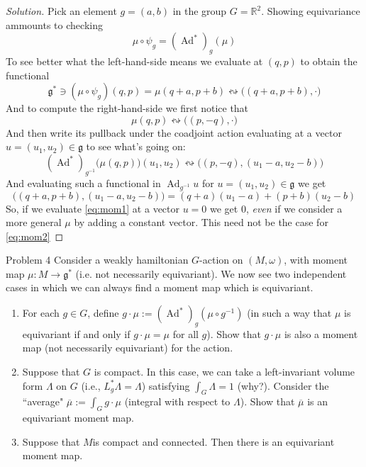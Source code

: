 \begin{proof}[Solution]
Pick an element $g=(a,b)$ in the group $G=\mathbb{R}^2$. Showing equivariance ammounts to checking
\[\mu \circ \psi_g=(\operatorname{Ad}^*)_g(\mu)\]
To see better what the left-hand-side means we evaluate at $(q,p)$ to obtain the functional
\begin{equation}\label{eq:mom1}
\mathfrak{g}^*\ni(\mu \circ \psi_g)(q,p)=\mu(q+a,p+b)\leftrightsquigarrow \Big((q+a,p+b),\cdot\Big)
\end{equation}
And to compute the right-hand-side we first notice that
\[\mu(q,p)\leftrightsquigarrow\Big((p,-q),\cdot\Big)\]
And then write its pullback under the coadjoint action evaluating at a vector $u=(u_1,u_2)\in\mathfrak{g}$ to see what's going on:
\[(\operatorname{Ad}^*)_{g^{-1}}\Big(\mu(q,p)\Big)(u_1,u_2)\leftrightsquigarrow\Big((p,-q),(u_1-a,u_2-b)\Big)\]
And evaluating such a functional in $\operatorname{Ad}_{g^{-1}}u$ for $u=(u_1,u_2)\in\mathfrak{g}$ we get
\begin{equation}\label{eq:mom2}
	\Big((q+a,p+b),(u_1-a,u_2-b)\Big)=(q+a)(u_1-a)+(p+b)(u_2-b)
	\end{equation}
So, if we evaluate  \cref{eq:mom1} at a vector $u=0$ we get 0, \textit{even} if we consider a more general $\mu$ by adding a constant vector. This need not be the case for \cref{eq:mom2}
\end{proof}

\begin{thing1}{Problem 4}\leavevmode
Consider a weakly hamiltonian $G$-action on $(M,\omega)$, with moment map $\mu:M\to\mathfrak{g}^*$ (i.e. not necessarily equivariant). We now see two independent cases in which we can always find a moment map which is equivariant.
\begin{enumerate}[label=(\alph*)]
\item For each $g\in G$, define $g\cdot\mu:=(\operatorname{Ad}^*)_g(\mu\circ g^{-1})$ (in such a way that $\mu$ is equivariant if and only if $g\cdot \mu=\mu$ for all $g$). Show that $g\cdot\mu$ is also a moment map (not necessarily equivariant) for the action.

\item Suppose that $G$ is compact. In this case, we can take a left-invariant volume form $\Lambda$ on $G$ (i.e., $L^*_g\Lambda=\Lambda$) satisfying $\int_{G}\Lambda=1$ (why?). Consider the ``average" $\overline{\mu}:=\int_{G}g\cdot\mu$ (integral with respect to $\Lambda$). Show that $\overline{\mu}$ is an equivariant moment map.
\item Suppose that $M$is compact and connected. Then there is an equivariant moment map. 
\end{enumerate}
\end{thing1}

